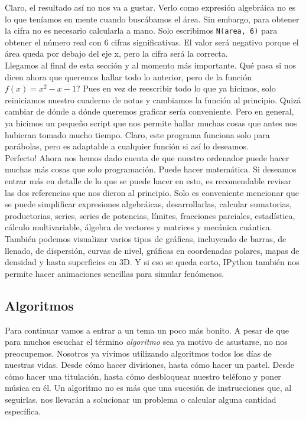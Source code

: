 \documentclass[10pt,letterpaper]{article}
\newcommand{\inlinecode}[1]{
\colorbox{light-gray}{\texttt{#1}}
}
\begin{document}
Claro, el resultado as\'i no nos va a gustar. Verlo como expresi\'on algebr\'aica no es lo que ten\'iamos en mente cuando busc\'abamos el \'area. Sin embargo, para obtener la cifra no es necesario calcularla a mano. Solo escribimos \inlinecode{N(area, 6)} para obtener el n\'umero real con 6 cifras significativas. El valor ser\'a negativo porque el \'area queda por debajo del eje x, pero la cifra ser\'a la correcta.\\

Llegamos al final de esta secci\'on y al momento m\'as importante. Qu\'e pasa si nos dicen ahora que queremos hallar todo lo anterior, pero de la funci\'on $f(x) = x^2 - x - 1$? Pues en vez de reescribir todo lo que ya hicimos, solo reiniciamos nuestro cuaderno de notas y cambiamos la funci\'on al principio. Quiz\'a cambiar de d\'onde a d\'onde queremos graficar ser\'ia conveniente. Pero en general, ya hicimos un peque\~no script que nos permite hallar muchas cosas que antes nos hubieran tomado mucho tiempo. Claro, este programa funciona solo para par\'abolas, pero es adaptable a cualquier funci\'on si as\'i lo deseamos.\\

Perfecto! Ahora nos hemos dado cuenta de que nuestro ordenador puede hacer muchas m\'as cosas que solo programaci\'on. Puede hacer matem\'atica. Si deseamos entrar m\'as en detalle de lo que se puede hacer en esto, es recomendable revisar las dos referencias que nos dieron al principio. Solo es conveniente mencionar que se puede simplificar expresiones algebr\'aicas, desarrollarlas, calcular sumatorias, productorias, series, series de potencias, l\'imites, fracciones parciales, estad\'istica, c\'alculo multivariable, \'algebra de vectores y matrices y mec\'anica cu\'antica. Tambi\'en podemos visualizar varios tipos de gr\'aficas, incluyendo de barras, de llenado, de dispersi\'on, curvas de nivel, gr\'aficas en coordenadas polares, mapas de densidad y hasta superficies en 3D. Y si eso se queda corto, IPython tambi\'en nos permite hacer animaciones sencillas para simular fen\'omenos.

\subsection{Algoritmos}
Para continuar vamos a entrar a un tema un poco m\'as bonito. A pesar de que para muchos escuchar el t\'ermino \emph{algoritmo} sea ya motivo de asustarse, no nos preocupemos. Nosotros ya vivimos utilizando algoritmos todos los d\'ias de nuestras vidas. Desde c\'omo hacer divisiones, hasta c\'omo hacer un pastel. Desde c\'omo hacer una titulaci\'on, hasta c\'omo desbloquear nuestro tel\'efono y poner m\'usica en \'el. Un algoritmo no es m\'as que una sucesi\'on de instrucciones que, al seguirlas, nos llevar\'an a solucionar un problema o calcular alguna cantidad espec\'ifica.\\
\end{document}
